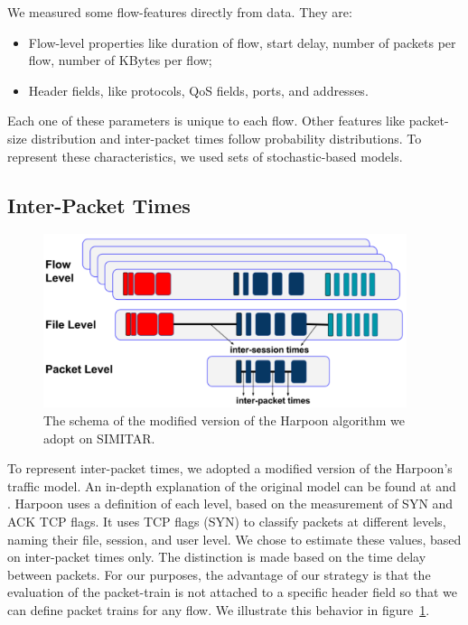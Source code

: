 We measured some flow-features directly from data. They are:

\begin{itemize}
\item Flow-level properties like duration of flow, start delay, number of packets per flow, number of KBytes per flow;
\item Header fields, like protocols, QoS fields, ports, and addresses.
\end{itemize}

Each one of these parameters is unique to each flow. Other features like packet-size distribution and inter-packet times follow probability distributions. To represent these characteristics, we used sets of stochastic-based models.

\subsection{Inter-Packet Times}


\begin{figure}[ht!]
    \centering
    \includegraphics[height=2.0in]{figures/ch3/modified-harpoon-model}
    \caption{The schema of the modified version of the Harpoon algorithm we adopt on SIMITAR.}
    \label{fig:modified-harpoon-model}
\end{figure}


To represent inter-packet times, we adopted a modified version of the Harpoon’s traffic model. An in-depth explanation of the original model can be found at  \cite{harpoon-paper} and \cite{harpoon-validation}. Harpoon uses a definition of each level, based on the measurement of \acrshort{SYN} and \acrshort{ACK} TCP flags. It uses TCP flags (SYN) to classify packets at different levels, naming their file, session, and user level. We chose to estimate these values, based on inter-packet times only. The distinction is made based on the time delay between packets. For our purposes, the advantage of our strategy is that the evaluation of the packet-train is not attached to a specific header field so that we can define packet trains for any flow. We illustrate this behavior in figure~\ref{fig:modified-harpoon-model}.


